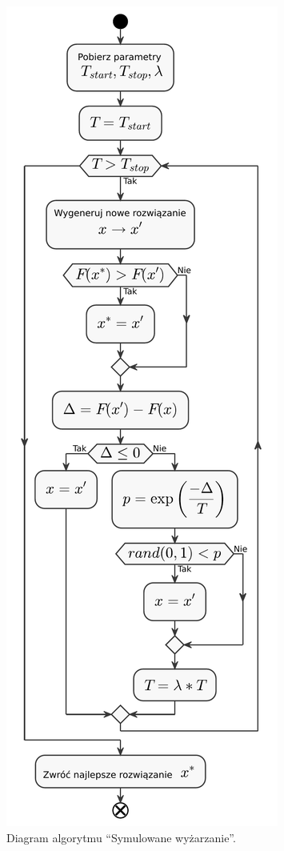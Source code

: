 \begin{figure}[H]
	\centering
	\includegraphics[scale=0.67]{chapters/chapter4/sa.pdf}
	\caption{Diagram algorytmu ``Symulowane wyżarzanie''.}
	\label{sa}
\end{figure}
